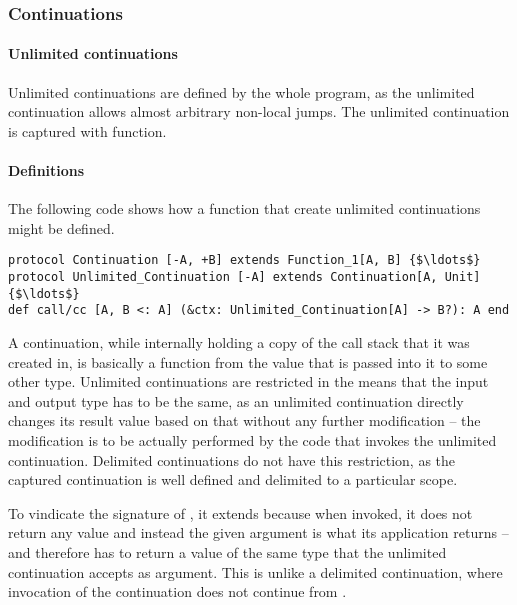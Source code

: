 \subsubsection{Continuations}
\label{sec:continuations}






\paragraph{Unlimited continuations}

Unlimited continuations are defined by the whole program, as the unlimited continuation allows almost arbitrary non-local jumps. The unlimited continuation is captured with  function. 

\paragraph{Definitions}
The following code shows how a function that create unlimited continuations might be defined. 
\begin{lstlisting}
protocol Continuation [-A, +B] extends Function_1[A, B] {$\ldots$}
protocol Unlimited_Continuation [-A] extends Continuation[A, Unit] {$\ldots$}
def call/cc [A, B <: A] (&ctx: Unlimited_Continuation[A] -> B?): A end
\end{lstlisting}

A continuation, while internally holding a copy of the call stack that it was created in, is basically a function from the value that is passed into it to some other type. Unlimited continuations are restricted in the means that the input and output type has to be the same, as an unlimited continuation directly changes its result value based on that without any further modification -- the modification is to be actually performed by the code that invokes the unlimited continuation. Delimited continuations do not have this restriction, as the captured continuation is well defined and delimited to a particular scope. 

To vindicate the signature of , it extends  because when invoked, it does not return any value and instead the given argument is what its  application returns -- and therefore  has to return a value of the same type that the unlimited continuation accepts as argument. This is unlike a delimited continuation, where invocation of the continuation does not continue from . 

